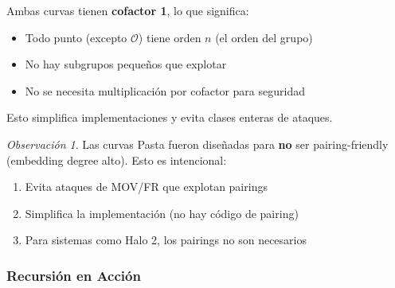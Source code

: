 \documentclass[11pt,a4paper,twoside,openright]{book}
\theoremstyle{definition}
\theoremstyle{plain}
\theoremstyle{remark}
\newtheorem{remark}{Observación}[chapter]
\begin{document}
\begin{keyidea}
Ambas curvas tienen \textbf{cofactor 1}, lo que significa:
\begin{itemize}
    \item Todo punto (excepto $\mathcal{O}$) tiene orden $n$ (el orden del grupo)
    \item No hay subgrupos pequeños que explotar
    \item No se necesita multiplicación por cofactor para seguridad
\end{itemize}

Esto simplifica implementaciones y evita clases enteras de ataques.
\end{keyidea}

\begin{remark}
Las curvas Pasta fueron diseñadas para \textbf{no} ser pairing-friendly (embedding degree alto). Esto es intencional:
\begin{enumerate}
    \item Evita ataques de MOV/FR que explotan pairings
    \item Simplifica la implementación (no hay código de pairing)
    \item Para sistemas como Halo 2, los pairings no son necesarios
\end{enumerate}
\end{remark}

\subsubsection{Recursión en Acción}
\end{document}
